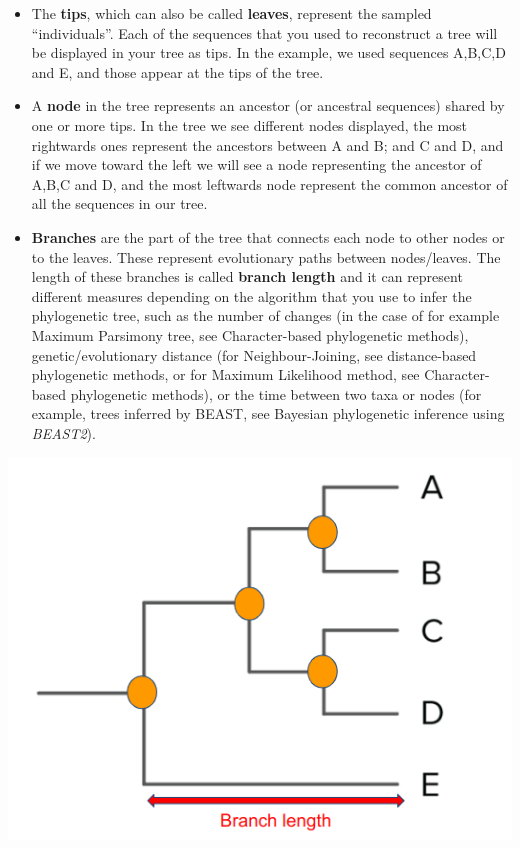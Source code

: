 \documentclass[
  letterpaper,
]{book}
\providecommand{\tightlist}{%
  \setlength{\itemsep}{0pt}\setlength{\parskip}{0pt}}\usepackage{longtable,booktabs,array}
\begin{document}
\begin{itemize}
\tightlist
\item
  The \textbf{tips}, which can also be called \textbf{leaves}, represent
  the sampled ``individuals''. Each of the sequences that you used to
  reconstruct a tree will be displayed in your tree as tips. In the
  example, we used sequences A,B,C,D and E, and those appear at the tips
  of the tree.
\item
  A \textbf{node} in the tree represents an ancestor (or ancestral
  sequences) shared by one or more tips. In the tree we see different
  nodes displayed, the most rightwards ones represent the ancestors
  between A and B; and C and D, and if we move toward the left we will
  see a node representing the ancestor of A,B,C and D, and the most
  leftwards node represent the common ancestor of all the sequences in
  our tree.
\item
  \textbf{Branches} are the part of the tree that connects each node to
  other nodes or to the leaves. These represent evolutionary paths
  between nodes/leaves. The length of these branches is called
  \textbf{branch length} and it can represent different measures
  depending on the algorithm that you use to infer the phylogenetic
  tree, such as the number of changes (in the case of for example
  Maximum Parsimony tree, see Character-based phylogenetic methods),
  genetic/evolutionary distance (for Neighbour-Joining, see
  distance-based phylogenetic methods, or for Maximum Likelihood method,
  see Character-based phylogenetic methods), or the time between two
  taxa or nodes (for example, trees inferred by BEAST, see Bayesian
  phylogenetic inference using \emph{BEAST2}).
\end{itemize}

\includegraphics{assets/images/chapters/phylogenomics/1.png}
\end{document}

